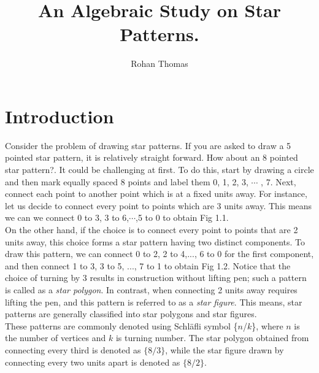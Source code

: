 \documentclass{article}
\title{An Algebraic Study on Star Patterns.}
\author{Rohan Thomas}
\begin{document}
\maketitle
\section{Introduction}
Consider the problem of drawing star patterns. If you are asked to draw a 5 pointed star pattern, it is relatively straight forward. How about an 8 pointed star pattern?. It could be challenging at first. To do this, start by drawing a circle and then mark equally spaced 8 points and label them 0, 1, 2, 3, $\cdots$ , 7.  Next, connect each point to another point which is at a fixed units away. For instance, let us decide to connect every point to points which are 3 units away. This means we can we connect 0 to 3, 3 to 6,$\cdots$,5 to 0 to obtain Fig 1.1. \\[2mm]
On the other hand, if the choice is to connect every point to points that are 2 units away, this choice forms a star pattern having two distinct components. To draw this pattern, we can connect 0 to 2, 2 to 4,..., 6 to 0 for the first component, and then connect 1 to 3, 3 to 5, ..., 7 to 1 to obtain Fig 1.2. Notice that the choice of turning by 3 results in construction without lifting pen; such a pattern is called as a \textit{star polygon}. In contrast, when connecting 2 units away requires lifting the pen, and this pattern is referred to as a \textit{star figure}. This means, star patterns are generally classified into star polygons and star figures.\\[2mm]
These patterns are commonly denoted using Schläfli symbol \{$n$/$k$\}, where $n$ is the number of vertices and $k$ is turning number. The star polygon obtained from connecting every third is denoted as $\{8/3\}$, while the star figure drawn by connecting every two units apart is denoted as $\{8/2\}$.
\end{document}
